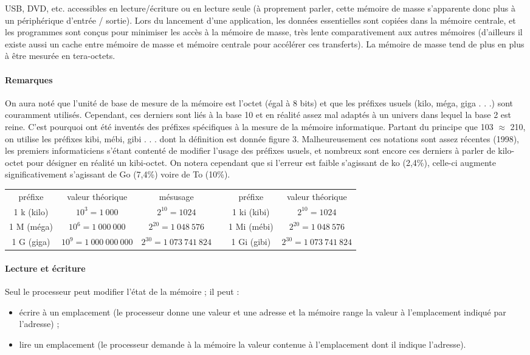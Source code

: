 \begin{itemize}
USB, DVD, etc. accessibles en lecture/écriture ou en lecture seule (à proprement parler, cette mémoire de
masse s’apparente donc plus à un périphérique d’entrée / sortie). Lors du lancement d’une application,
les données essentielles sont copiées dans la mémoire centrale, et les programmes sont conçus pour
minimiser les accès à la mémoire de masse, très lente comparativement aux autres mémoires (d’ailleurs
il existe aussi un cache entre mémoire de masse et mémoire centrale pour accélérer ces transferts). La
mémoire de masse tend de plus en plus à être mesurée en tera-octets.
\end{itemize}

\paragraph{Remarques} On aura noté que l’unité de base de mesure de la mémoire est l’octet (égal à 8 bits) et que les
préfixes usuels (kilo, méga, giga . . .) sont couramment utilisés. Cependant, ces derniers sont liés à la base 10 et
en réalité assez mal adaptés à un univers dans lequel la base 2 est reine. C’est pourquoi ont été inventés des
préfixes spécifiques à la mesure de la mémoire informatique. Partant du principe que 103 $\approx$ 210, on utilise les
préfixes kibi, mébi, gibi . . . dont la définition est donnée figure 3.
Malheureusement ces notations sont assez récentes (1998), les premiers informaticiens s’étant contenté de
modifier l’usage des préfixes usuels, et nombreux sont encore ces derniers à parler de kilo-octet pour désigner
en réalité un kibi-octet. On notera cependant que si l’erreur est faible s’agissant de ko (2,4\%), celle-ci augmente
significativement s’agissant de Go (7,4\%) voire de To (10\%).

\begin{tabular}{|c|c|c|c|c|c|}\cline{1-3}\cline{5-6}
    préfixe &valeur théorique &mésusage& & préfixe &valeur théorique\\ \cline{1-3}\cline{5-6}
    1 k (kilo)  & $10^3=1~000$ &$2^{10}=1024$& & 1 ki (kibi)&$ 2^{10} = 1 024$\\\cline{1-3}\cline{5-6}
    1 M (méga)  & $10^6=1~000~000$ &$2^{20}=1~048~576$& & 1 Mi (mébi)&$2^{20}=1~048~576$\\\cline{1-3}\cline{5-6}
    1 G (giga)  & $10^9=1~000~000~000$ &$2^{30}=1~073~741~824$& & 1 Gi (gibi)&$2^{30}=1~073~741~824$\\\cline{1-3}\cline{5-6}
\end{tabular}

\paragraph{Lecture et écriture}
Seul le processeur peut modifier l’état de la mémoire ; il peut :
\begin{itemize}
    \item écrire à un emplacement (le processeur donne une valeur et une adresse et la mémoire range la valeur à
l’emplacement indiqué par l’adresse) ;
\item lire un emplacement (le processeur demande à la mémoire la valeur contenue à l’emplacement dont il
indique l’adresse).
\end{itemize}

